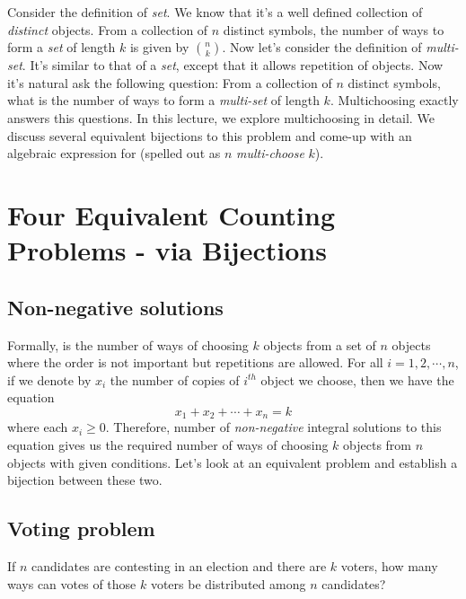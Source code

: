 
Consider the definition of \emph{set}. We know that it's a well defined collection of \emph{distinct} objects. From a collection of $n$ distinct symbols, the number of ways to form a \emph{set} of length $k$ is given by $\binom{n}{k}$. Now let's consider the definition of \emph{multi-set}. It's similar to that of a \emph{set}, except that it allows repetition of objects. Now it's natural ask the following question: From a collection of $n$ distinct symbols, what is the number of ways to form a \emph{multi-set} of length $k$. Multichoosing exactly answers this questions. In this lecture, we explore multichoosing in detail. We discuss several equivalent bijections to this problem and come-up with an algebraic expression for  (spelled out as $n$ \emph{multi-choose} $k$).

\section{Four Equivalent Counting Problems - via Bijections} \label{sec:equi-bij}
\subsection*{Non-negative solutions}\label{non-neq-sol-prob}
Formally,  is the number of ways of choosing $k$ objects from a set of $n$ objects where the order is not important but repetitions are allowed. For all $i=1,2,\cdots,n$, if we denote by $x_i$ the number of copies of $i^{th}$ object we choose, then we have the equation \begin{equation}\label{eqn1}
    x_1+x_2+\cdots+x_n=k
\end{equation} where each $x_i \geq 0$. Therefore, number of \emph{non-negative} integral solutions to this equation gives us the required number of ways of choosing $k$ objects from $n$ objects with given conditions. Let's look at an equivalent problem and establish a bijection between these two.

\subsection*{Voting problem}\label{voting-prob} If $n$ candidates are contesting in an election and there are $k$ voters, how many ways can votes of those $k$ voters be distributed among $n$ candidates? 


